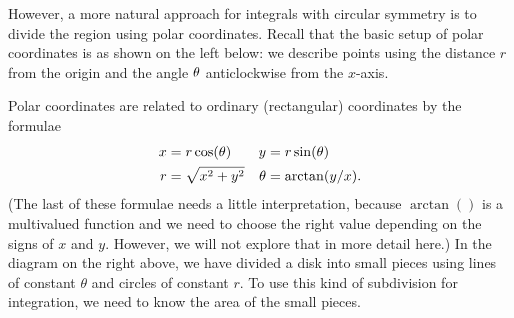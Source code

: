 \documentclass[reqno]{amsart}
\theoremstyle{definition}
\begin{document}
However, a more natural approach for integrals with circular symmetry
is to divide the region using polar coordinates.  Recall that the
basic setup of polar coordinates is as shown on the left below: we
describe points using the distance $r$ from the origin and the angle
$\theta$ anticlockwise from the $x$-axis.
\begin{center}
 \hspace{4em}
\end{center}
Polar coordinates are related to ordinary (rectangular) coordinates by
the formulae
\begin{align*}
 x &= r\cos(\theta) & y &= r\sin(\theta) \\
 r &= \sqrt{x^2+y^2} & \theta &= \arctan(y/x).
\end{align*}
(The last of these formulae needs a little interpretation, because
$\arctan()$ is a multivalued function and we need to choose the right
value depending on the signs of $x$ and $y$.  However, we will not
explore that in more detail here.)  In the diagram on the right above,
we have divided a disk into small pieces using lines of constant
$\theta$ and circles of constant $r$.  To use this kind of subdivision
for integration, we need to know the area of the small pieces. 
\end{document}
